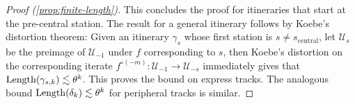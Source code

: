 \begin{proof}[Proof (\cref{prop:finite-length})]
This concludes the proof for itineraries that start at the pre-central station. The result for a general itinerary follows by Koebe's distortion theorem: Given an itinerary $\gamma_s$ whose first station is $s \neq s_{\mathrm{central}}$, let $\mathcal U_s$ be the preimage of $\mathcal U_{-1}$ under $f$ corresponding to $s$, then Koebe's distortion on the corresponding iterate $f^{\circ(-m)}: \mathcal U_{-1} \to \mathcal U_{-s}$ immediately gives that $\operatorname{Length}(\gamma_{s,k}) \lesssim \theta ^k$. This proves the bound on express tracks. The analogous bound $\operatorname{Length}(\delta_k)\lesssim \theta^k$ for peripheral tracks is similar.
\end{proof}

\begin{comment}
\begin{proof}
The idea is that peripheral tracks never turn twice in the same direction, so cannot approach the cusp $p$ in a parabolic manner. Thus at large scales the length decays by a definite factor, and by the self-similarity of itineraries the same happens on the small-scale.
To make this rigorous, consider first the set $\Gamma_{\downarrow \downarrow \downarrow}$ of reduced tracks that start at the central station $s_{0,0}$ with at least three consecutive express tracks. Take a neighborhood $N$ of the union of all those tracks on which $f$ is univalent. %
For every station $s$, the corresponding family $\Gamma^s_{\downarrow \downarrow \downarrow}$ of tracks starting at $s$ is the preimage of $\Gamma_{\downarrow \downarrow \downarrow}$  under some branch of an iterate of $f^{-1}$ which maps the central station $s_{0,0}$ to $s$.
Koebe's distortion theorem on this branch gives that
\begin{equation}
\diam(\shadow(s)) \asymp \dist (s,\mathcal J) \asymp \diam (N_s) \asymp \min_{\gamma \in \Gamma^s_{\downarrow \downarrow \downarrow}} \Length(\gamma)
\end{equation}
where $N_s$ is the preimage of $N$. Thus the length of $\eta_j$ decays at the same rate as $\dist(s,\mathcal J)$. %

We used the assumption that the itinerary starts with at least three express tracks to have the neighborhood $N$. For itineraries that do not start with three consecutive express tracks, we consider separately the family $\Gamma_{\downarrow \downarrow \leftarrow}$ of those itineraries which start with two express tracks followed by a left itinerary, and the similarly-defined $\Gamma_{\downarrow \downarrow \rightarrow}$. For each of these families, the previous argument holds since there is such a neighborhood $N$ of univalence.
\end{proof}
The shadows were not strictly necessary for the preceding proof, but they draw an analogy with similar estimates for the Farey tesselation of the disk.
\end{comment}

